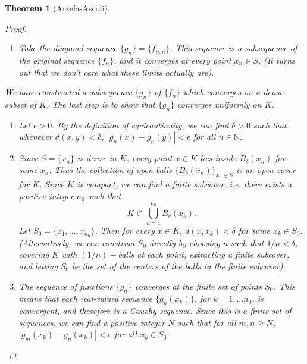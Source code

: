 \documentclass[12pt]{amsart}         %
\newtheorem{theorem}{Theorem}[section]
\theoremstyle{remark}
\newcommand{\N}{\mathbb{N}}
\begin{document}
\begin{theorem}[Arzela-Ascoli]
\begin{proof}
\begin{enumerate}
\begin{table}[H]
\begin{tabular}{cccc}
        \end{tabular}
    \end{table}
    By construction, each row in the grid is a subsequence of the previous row, and the sequence of functions in row $n$ converges at the points $x_1, \dots x_n$.
    \item Take the diagonal sequence $\{ g_n \} = \{ f_{n,n} \}$. This sequence is a subsequence of the original sequence $\{f_n\}$, and it converges at every point $x_n \in S$. (It turns out that we don't care what these limits actually are).
\end{enumerate}
We have constructed a subsequence $\{g_n\}$ of $\{f_n\}$ which converges on a dense subset of $K$. The last step is to show that $\{g_n\}$ converges uniformly on $K$.
\begin{enumerate}
    \item Let $\epsilon > 0$. By the definition of equicontinuity, we can find $\delta > 0$ such that whenever $d(x,y) < \delta$, $|g_n(x) - g_n(y)| < \epsilon$ for all $n \in \N$.
    \item Since $S = \{ x_n \}$ is dense in $K$, every point $x \in K$ lies inside $B_\delta(x_n)$ for some $x_n$. Thus the collection of open balls $\{ B_\delta(x_n) \}_{x_n \in S}$ is an open cover for $K$. Since $K$ is compact, we can find a finite subcover, i.e. there exists a positive integer $n_0$ such that
    \[
    K \subset \bigcup_{k = 1}^{n_0} B_\delta(x_k).
    \]
    Let $S_0 = \{ x_1, \dots, x_{n_0} \}$. Then for every $x \in K$, $d(x, x_k) < \delta$ for some $x_k \in S_0$. (Alternatively, we can construct $S_0$ directly by choosing $n$ such that $1/n < \delta$, covering $K$ with $(1/n)-$balls at each point, extracting a finite subcover, and letting $S_0$ be the set of the centers of the balls in the finite subcover).
    \item The sequence of functions $\{ g_n \}$ converges at the \emph{finite} set of points $S_0$. This means that each real-valued sequence $\{ g_n(x_k) \}$, for $k = 1, \dots n_0$, is convergent, and therefore is a Cauchy sequence. Since this is a finite set of sequences, we can find a positive integer $N$ such that for all $m, n \geq N$, $|g_m(x_k) - g_n(x_k)| <\epsilon$ for all $x_k \in S_0$.


\end{enumerate}
\end{proof}
\end{theorem}
\end{document}
